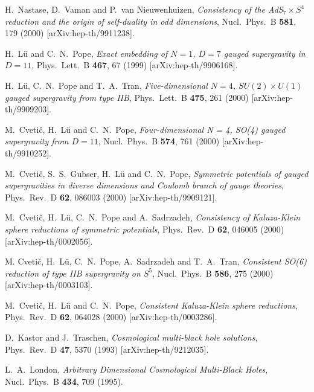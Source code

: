 \documentclass[a4paper,12pt]{article}
\begin{document}
\begin{thebibliography}{99}
H.~Nastase, D.~Vaman and P.~van Nieuwenhuizen,
{\sl Consistency of the AdS$_7\times S^4$ reduction and the origin of
self-duality in odd dimensions},
Nucl.\ Phys.\ B {\bf 581}, 179 (2000) [arXiv:hep-th/9911238].

H.~L\"u and C.~N.~Pope,
{\sl Exact embedding of $N=1$, $D=7$ gauged supergravity in $D=11$},
Phys.\ Lett.\ B {\bf 467}, 67 (1999) [arXiv:hep-th/9906168].

H.~L\"u, C.~N.~Pope and T.~A.~Tran,
{\sl Five-dimensional $N=4$, $SU(2) \times U(1)$ gauged supergravity from
type IIB},
Phys.\ Lett.\ B {\bf 475}, 261 (2000) [arXiv:hep-th/9909203].

M.~Cveti\v{c}, H.~L\"u and C.~N.~Pope,
{\sl Four-dimensional N = 4, SO(4) gauged supergravity from $D = 11$},
Nucl.\ Phys.\ B {\bf 574}, 761 (2000) [arXiv:hep-th/9910252].

M.~Cveti\v{c}, S.~S.~Gubser, H.~L\"u and C.~N.~Pope,
{\sl Symmetric potentials of gauged supergravities in diverse dimensions
and Coulomb branch of gauge theories},
Phys.\ Rev.\ D {\bf 62}, 086003 (2000) [arXiv:hep-th/9909121].

M.~Cveti\v{c}, H.~L\"u, C.~N.~Pope and A.~Sadrzadeh,
{\sl Consistency of Kaluza-Klein sphere reductions of symmetric potentials},
Phys.\ Rev.\ D {\bf 62}, 046005 (2000) [arXiv:hep-th/0002056].

M. Cveti\v{c}, H.~L\"u, C.~N.~Pope, A.~Sadrzadeh and T.~A.~Tran,
{\sl Consistent SO(6) reduction of type IIB supergravity on $S^5$},
Nucl.\ Phys.\ B {\bf 586}, 275 (2000) [arXiv:hep-th/0003103].

M.~Cveti\v{c}, H.~L\"u and C.~N.~Pope,
{\sl Consistent Kaluza-Klein sphere reductions},
Phys.\ Rev.\ D {\bf 62}, 064028 (2000) [arXiv:hep-th/0003286].

D.~Kastor and J.~Traschen,
{\sl Cosmological multi-black hole solutions},
Phys.\ Rev.\ D {\bf 47}, 5370 (1993) [arXiv:hep-th/9212035].

L.~A.~London,
{\sl Arbitrary Dimensional Cosmological Multi-Black Holes},
Nucl.\ Phys.\ B {\bf 434}, 709 (1995).


\end{thebibliography}
\end{document}
